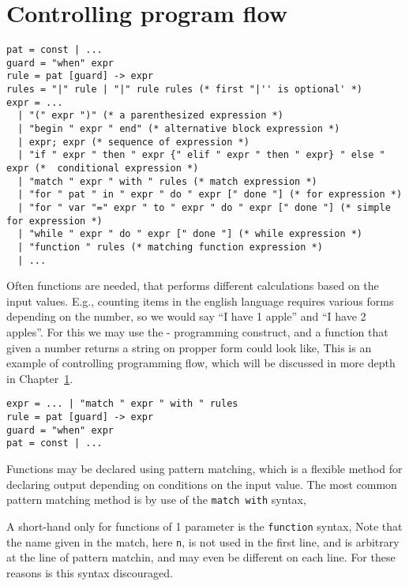 \chapter{Controlling program flow}
\label{chap:flow}

\begin{lstlisting}[language=EBNF]
pat = const | ...
guard = "when" expr
rule = pat [guard] -> expr
rules = "|" rule | "|" rule rules (* first "|'' is optional' *)
expr = ... 
  | "(" expr ")" (* a parenthesized expression *)
  | "begin " expr " end" (* alternative block expression *)
  | expr; expr (* sequence of expression *)
  | "if " expr " then " expr {" elif " expr " then " expr} " else " expr (*  conditional expression *)
  | "match " expr " with " rules (* match expression *)
  | "for " pat " in " expr " do " expr [" done "] (* for expression *)
  | "for " var "=" expr " to " expr " do " expr [" done "] (* simple for expression *)
  | "while " expr " do " expr [" done "] (* while expression *)
  | "function " rules (* matching function expression *)
  | ...
\end{lstlisting}

Often functions are needed, that performs different calculations based on the input values. E.g., counting items in the english language requires various forms depending on the number, so we would say ``I have 1 apple'' and ``I have 2 apples''. For this we may use the - programming construct, and a function that given a number returns a string on propper form could look like,
%
%
This is an example of controlling programming flow, which will be discussed in more depth in Chapter~\ref{chap:flow}.
\begin{lstlisting}[language=ebnf]
expr = ... | "match " expr " with " rules 
rule = pat [guard] -> expr
guard = "when" expr
pat = const | ...     
\end{lstlisting}

Functions may be declared using pattern matching, which is a flexible method for declaring output depending on conditions on the input value. The most common pattern matching method is by use of the \texttt{match with} syntax,

A short-hand only for functions of 1 parameter is the \texttt{function} syntax,
Note that the name given in the match, here \texttt{n}, is not used in the first line, and is arbitrary at the line of pattern matchin, and may even be different on each line. For these reasons is this syntax discouraged.

